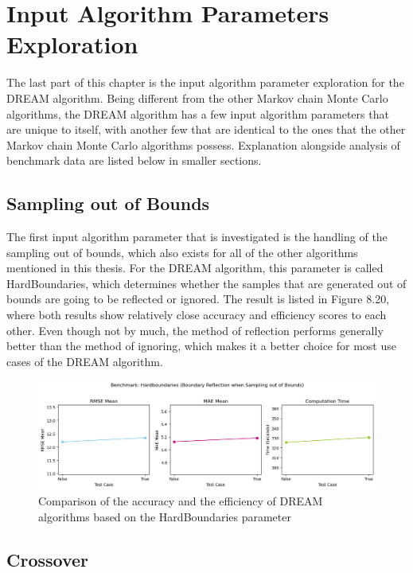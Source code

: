 \section{Input Algorithm Parameters Exploration}
The last part of this chapter is the input algorithm parameter exploration for the DREAM algorithm. Being different from the other Markov chain Monte Carlo algorithms, the DREAM algorithm has a few input algorithm parameters that are unique to itself, with another few that are identical to the ones that the other Markov chain Monte Carlo algorithms possess. Explanation alongside analysis of benchmark data are listed below in smaller sections. 

\subsection{Sampling out of Bounds}
The first input algorithm parameter that is investigated is the handling of the sampling out of bounds, which also exists for all of the other algorithms mentioned in this thesis. For the DREAM algorithm, this parameter is called HardBoundaries, which determines whether the samples that are generated out of bounds are going to be reflected or ignored. The result is listed in Figure 8.20, where both results show relatively close accuracy and efficiency scores to each other. Even though not by much, the method of reflection performs generally better than the method of ignoring, which makes it a better choice for most use cases of the DREAM algorithm.

\begin{figure}[H]
    \centering
    \includegraphics[width=1\textwidth]{figures/dream/sotb.png}
    \captionsetup{width=.8\textwidth}
    \caption{Comparison of the accuracy and the efficiency of DREAM algorithms based on the HardBoundaries parameter}
    \label{fig:enter-label}
\end{figure}

\subsection{Crossover}

